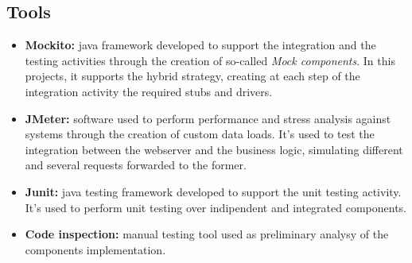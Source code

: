 \subsection{Tools}

\begin{itemize}
	\item \textbf{Mockito:} java framework developed to support the integration and the testing activities through the creation of so-called \textit{Mock components}. In this projects, it supports the hybrid strategy, creating at each step of the integration activity the required stubs and drivers.

	\item \textbf{JMeter:} software used to perform performance and stress analysis against systems through the creation of custom data loads.
It's used to test the integration between the webserver and the business logic, simulating different and several requests forwarded to the former.

	\item \textbf{Junit:} java testing framework developed to support the unit testing activity. It's used to perform unit testing over indipendent and integrated components. 

	\item \textbf{Code inspection:} manual testing tool used as preliminary analysy of the components implementation. 
\end{itemize}
